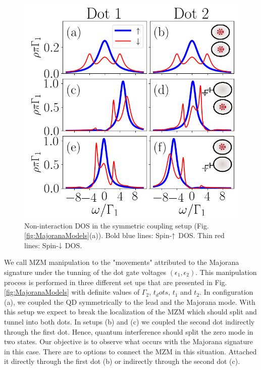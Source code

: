 \documentclass[showpacs,aps,prb,reprint,superscriptaddress]{revtex4-1}
\begin{document}
\begin{figure}[bt]
\begin{center}
\includegraphics[scale=0.48]{Graficos/t1=t2.png}
\caption{ \label{fig:t1=t2}  Non-interaction DOS in the symmetric coupling setup (Fig.\ref{fig:MajoranaModels}(a)). Bold blue lines: Spin-$\uparrow$ DOS. Thin red lines: Spin-$\downarrow$ DOS.  
}
%
\end{center}
\end{figure}

     We call MZM manipulation to the "movements" attributed to the Majorana signature under the tunning of the dot gate voltages $( \epsilon_1 , \epsilon_2 )$. This manipulation process is performed in three different set ups that are presented in Fig.\ref{fig:MajoranaModels} with definite values of $\Gamma_2$, $t_dots$, $t_1$ and $t_2$. In configuration (a), we coupled the QD symmetrically to the lead and the Majorana mode. With this setup we expect to break the localization of the MZM which should split and tunnel into both dots. In setups (b) and (c) we coupled the second dot indirectly through the first dot. Hence, quantum  interference should split the zero mode in two states. Our objective is to observe what occurs with the Majorana signature in this case. There are to options to connect the MZM in this situation. Attached it directly through the first dot (b) or indirectly through the second dot (c). 
\end{document}
